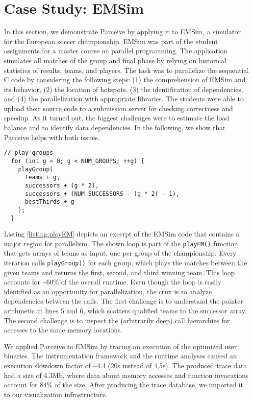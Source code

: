 \section{Case Study: EMSim}
\label{sec:case_study}
In this section, we demonstrate Parceive by applying it to EMSim, a simulator
for the European soccer championship. EMSim was part of the student assignments
for a master course on parallel programming. The application simulates all
matches of the group and final phase by relying on historical statistics of
results, teams, and players. The task was to parallelize the sequential C code
by considering the following steps: (1) the comprehension of EMSim and its
behavior, (2) the location of hotspots, (3) the identification of dependencies,
and (4) the parallelization with appropriate libraries. The students were able
to upload their source code to a submission server for checking correctness and
speedup. As it turned out, the biggest challenges were to estimate the load
balance and to identify data dependencies. In the following, we show
that Parceive helps with both issues.

\begin{lstlisting}[caption=A major region for loop-parallelism in the
EMSim code, label=listing:playEM]
  // play groups
  for (int g = 0; g < NUM_GROUPS; ++g) {
    playGroup(
      teams + g,
      successors + (g * 2),
      successors + (NUM_SUCCESSORS - (g * 2) - 1),
      bestThirds + g
    );
  }
\end{lstlisting}

Listing \ref{listing:playEM} depicts an excerpt of the EMSim code that contains
a major region for parallelism. The shown loop is part of the \texttt{playEM()}
function that gets arrays of teams as input, one per group of the championship.
Every iteration calls \texttt{playGroup()} for each group, which plays the
matches between the given teams and returns the first, second, and third
winning team. This loop accounts for \textasciitilde60\% of the overall
runtime. Even though the loop is easily identified as an opportunity for
parallelization, the crux is to analyze dependencies between the calls. The
first challenge is to understand the pointer arithmetic in lines 5 and 6, which
scatters qualified teams to the successor array. The second challenge is to
inspect the (arbitrarily deep) call hierarchies for accesses to the same memory
locations.

We applied Parceive to EMSim by tracing an execution of the optimized user
binaries. The instrumentation framework and the runtime analyses caused an
execution slowdown factor of \textasciitilde 4.4 (20s instead of 4,5s). The
produced trace data had a size of 4.3Mb, where data about memory accesses and
function invocations account for 84\% of the size. After producing the trace
database, we imported it to our visualization infrastructure.

